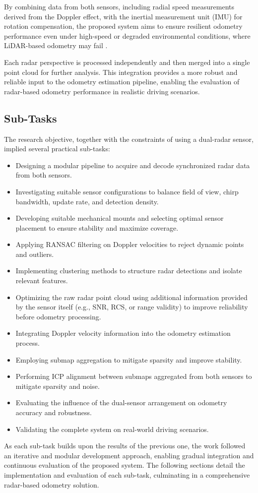 By combining data from both sensors, including radial speed measurements derived from the Doppler effect, with the inertial measurement unit (IMU) for rotation compensation, the proposed system aims to ensure resilient odometry performance even under high-speed or degraded environmental conditions, where LiDAR-based odometry may fail \cite{HighSpeed_Estimation}.

Each radar perspective is processed independently and then merged into a single point cloud for further analysis.
This integration provides a more robust and reliable input to the odometry estimation pipeline, enabling the evaluation of radar-based odometry performance in realistic driving scenarios.

\subsection{Sub-Tasks}

The research objective, together with the constraints of using a dual-radar sensor, implied several practical sub-tasks:  
\begin{itemize}
    \item Designing a modular pipeline to acquire and decode synchronized radar data from both sensors.
    \item Investigating suitable sensor configurations to balance field of view, chirp bandwidth, update rate, and detection density.  
    \item Developing suitable mechanical mounts and selecting optimal sensor placement to ensure stability and maximize coverage.
    \item Applying RANSAC filtering on Doppler velocities to reject dynamic points and outliers.
    \item Implementing clustering methods to structure radar detections and isolate relevant features.  
    \item Optimizing the raw radar point cloud using additional information provided by the sensor itself (e.g., SNR, RCS, or range validity) to improve reliability before odometry processing.  
    \item Integrating Doppler velocity information into the odometry estimation process.   
    \item Employing submap aggregation to mitigate sparsity and improve stability. 
    \item Performing ICP alignment between submaps aggregated from both sensors to mitigate sparsity and noise. 
    \item Evaluating the influence of the dual-sensor arrangement on odometry accuracy and robustness. 
    \item Validating the complete system on real-world driving scenarios. 
\end{itemize}

As each sub-task builds upon the results of the previous one, the work followed an iterative and modular development approach, enabling gradual integration and continuous evaluation of the proposed system.  
The following sections detail the implementation and evaluation of each sub-task, culminating in a comprehensive radar-based odometry solution.